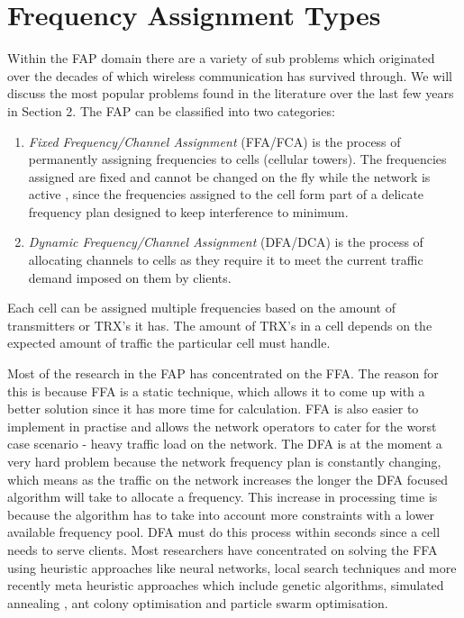 \section{Frequency Assignment Types}
Within the FAP domain there are  a variety of sub problems which originated over the decades of which wireless communication has survived through. We will discuss the most popular problems found in the literature over the last few years in Section 2. The FAP can be classified into two categories:
\begin{enumerate}[\bf{(}a\bf{)}]
\item \emph{Fixed Frequency/Channel Assignment} (FFA/FCA) is the process of permanently assigning frequencies to cells (cellular towers). The frequencies assigned are fixed and cannot be changed on the fly while 
the network is active , since the frequencies assigned to the cell form part of a delicate frequency plan designed to keep interference to minimum.
\item \emph{Dynamic Frequency/Channel Assignment} (DFA/DCA) is the process of allocating channels to cells as they require it to meet the current traffic demand imposed on them by clients. 
\end{enumerate}
Each cell can be assigned multiple frequencies based on the amount of transmitters or TRX's it has. The amount of TRX's in a cell depends on the expected amount of traffic the particular cell must 
handle.

Most of the research in the FAP has concentrated on the FFA. The reason for this is because FFA is a static technique, which allows it to come up with a better solution since it has more time for 
calculation. FFA is also easier to implement in practise and allows the network operators to cater for the worst case scenario - heavy traffic load on the network. The DFA is at the moment a very hard 
problem because the network frequency plan is constantly changing, which means as the traffic on the network increases the longer the DFA focused algorithm will take to allocate a frequency. This 
increase in processing time is because the algorithm has to take into account more constraints with a lower available frequency pool. DFA must do this process within seconds since a cell needs to serve clients. Most researchers have concentrated on solving the FFA using heuristic approaches like neural networks, local search techniques and more recently meta heuristic approaches which include genetic algorithms, simulated annealing , ant colony optimisation and particle swarm optimisation.

